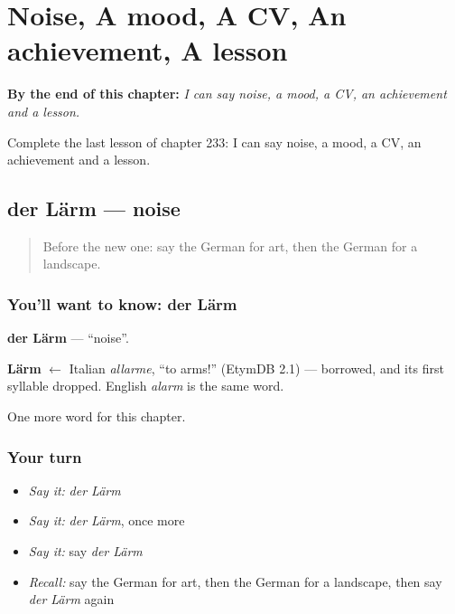 
\chapter{Noise, A mood, A CV, An achievement, A lesson}
\label{ch:ge-noise-a-mood-a-cv-an-achievement-a-lesson}

\begin{chapteropening}
\textbf{By the end of this chapter:} \emph{I can say noise, a mood, a CV, an achievement and a lesson.}

Complete the last lesson of chapter 233: I can say noise, a mood, a CV, an achievement and a lesson.
\end{chapteropening}

\section[der Lärm]{der Lärm — noise}

\label{lesson:GE-C233-laerm}



\begin{quote}
Before the new one: say the German for art, then the German for a landscape.
\end{quote}

\subsection*{You'll want to know: der Lärm}
\textbf{der Lärm} — \textquotedblleft{}noise\textquotedblright{}.

\begin{cousinweb}
\textbf{Lärm} $\leftarrow$ Italian \emph{allarme}, \textquotedblleft{}to arms!\textquotedblright{} (EtymDB 2.1) — borrowed, and its first syllable dropped. English \emph{alarm} is the same word.
\end{cousinweb}

\begin{grammarlens}[title={What you've built}]
One more word for this chapter.
\end{grammarlens}

\subsection*{Your turn}
\begin{itemize}
\raggedright
  \item \emph{Say it:} \emph{der Lärm}
  \item \emph{Say it:} \emph{der Lärm}, once more
  \item \emph{Say it:} say \emph{der Lärm}
  \item \emph{Recall:} say the German for art, then the German for a landscape, then say \emph{der Lärm} again
\end{itemize}


